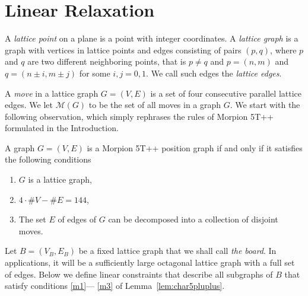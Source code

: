 
\section{Linear Relaxation}
\label{linear}


A \emph{lattice point} on a plane is a point with integer coordinates. A \emph{lattice graph} is a graph with vertices in lattice points and edges consisting of pairs $(p,q)$, where $p$ and $q$ are two different neighboring points, that is $p\neq q$ and $p=(n,m)$ and $q=(n\pm i,m\pm j)$ for some $i,j=0,1$. %
We call such edges the \emph{lattice edges}.


A \emph{move} in a lattice graph $G = (V, E)$ is a set of four consecutive parallel lattice edges. 
We let $\mathcal{M}(G)$ to be the set of all moves in a graph $G$.
We start with the following observation, which simply rephrases the rules of Morpion 5T++ formulated in the Introduction. 

\begin{lemma}%
\label{lem:char5pluplus}
A graph $G = (V, E)$ is a Morpion 5T++ position graph if and only if it satisfies the following conditions
  \begin{enumerate}
  \item[\namedlabel{m1}{(M1)}] $G$ is a lattice graph,
  \item[\namedlabel{m2}{(M2)}] $4 \cdot \# V - \# E = 144$,
  \item[\namedlabel{m3}{(M3)}] The set $E$ of edges of $G$ can be decomposed into a collection of disjoint moves.
  \end{enumerate}
\end{lemma}


Let $B = (V_B, E_B)$ be a fixed lattice graph that we shall call \emph{the board}. 
In applications, it will be a sufficiently large octagonal lattice graph with a full set of edges.
Below we define linear constraints that describe all subgraphs of $B$ that satisfy conditions \ref{m1}--- \ref{m3} of Lemma~\ref{lem:char5pluplus}.

